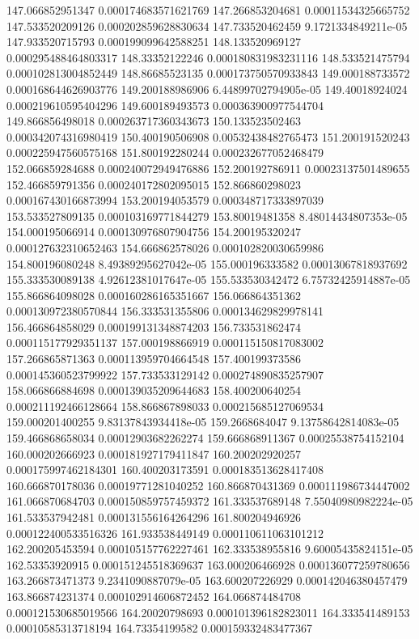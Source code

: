 {147.066852951347 0.000174683571621769
147.266853204681 0.00011534325665752
147.533520209126 0.000202859628830634
147.733520462459 9.1721334849211e-05
147.933520715793 0.000199099642588251
148.133520969127 0.000295488464803317
148.33352122246 0.000180831983231116
148.533521475794 0.000102813004852449
148.86685523135 0.000173750570933843
149.000188733572 0.000168644626903776
149.200188986906 6.44899702794905e-05
149.40018924024 0.000219610595404296
149.600189493573 0.000363900977544704
149.866856498018 0.000263717360343673
150.133523502463 0.000342074316980419
150.400190506908 0.00532438482765473
151.200191520243 0.000225947560575168
151.800192280244 0.000232677052468479
152.066859284688 0.000240072949476886
152.200192786911 0.00023137501489655
152.466859791356 0.000240172802095015
152.866860298023 0.000167430166873994
153.200194053579 0.000348717333897039
153.533527809135 0.000103169771844279
153.80019481358 8.48014434807353e-05
154.000195066914 0.000130976807904756
154.200195320247 0.000127632310652463
154.666862578026 0.000102820030659986
154.800196080248 8.49389295627042e-05
155.000196333582 0.00013067818937692
155.333530089138 4.92612381017647e-05
155.533530342472 6.75732425914887e-05
155.866864098028 0.000160286165351667
156.066864351362 0.000130972380570844
156.333531355806 0.000134629829978141
156.466864858029 0.000199131348874203
156.733531862474 0.000115177929351137
157.000198866919 0.000115150817083002
157.266865871363 0.000113959704664548
157.400199373586 0.000145360523799922
157.733533129142 0.000274890835257907
158.066866884698 0.000139035209644683
158.400200640254 0.000211192466128664
158.866867898033 0.000215685127069534
159.000201400255 9.83137843934418e-05
159.2668684047 9.13758642814083e-05
159.466868658034 0.00012903682262274
159.666868911367 0.00025538754152104
160.000202666923 0.000181927179411847
160.200202920257 0.000175997462184301
160.400203173591 0.000183513628417408
160.666870178036 0.00019771281040252
160.866870431369 0.000111986734447002
161.066870684703 0.000150859757459372
161.333537689148 7.55040980982224e-05
161.533537942481 0.000131556164264296
161.800204946926 0.000122400533516326
161.933538449149 0.000110611063101212
162.200205453594 0.000105157762227461
162.333538955816 9.60005435824151e-05
162.53353920915 0.000151245518369637
163.000206466928 0.000136077259780656
163.266873471373 9.2341090887079e-05
163.600207226929 0.000142046380457479
163.866874231374 0.000102914606872452
164.066874484708 0.000121530685019566
164.20020798693 0.000101396182823011
164.333541489153 0.00010585313718194
164.73354199582 0.000159332483477367
}
